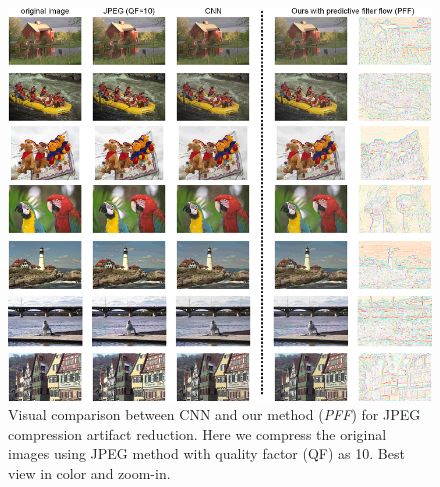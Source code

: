 \begin{figure}[t]
    \centering
    \begin{minipage}{0.97\textwidth}
        \centering
        \includegraphics[width=1\linewidth]{supple_jpeg.png}
    \end{minipage}
    \caption{
    Visual comparison between CNN and our method (\emph{PFF}) for JPEG compression artifact reduction.
    Here we compress the original images using JPEG method with quality factor (QF) as 10.
    Best view in color and zoom-in.}
    \label{fig:more_JPEG_reduction}
\end{figure}



